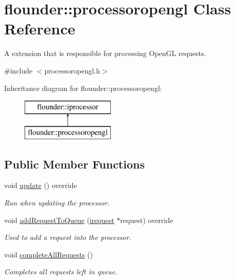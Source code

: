 \hypertarget{classflounder_1_1processoropengl}{}\section{flounder\+:\+:processoropengl Class Reference}
\label{classflounder_1_1processoropengl}


A extension that is responsible for processing Open\+GL requests.  




{\ttfamily \#include $<$processoropengl.\+h$>$}

Inheritance diagram for flounder\+:\+:processoropengl\+:\begin{figure}[H]
\begin{center}
\leavevmode
\includegraphics[height=2.000000cm]{classflounder_1_1processoropengl}
\end{center}
\end{figure}
\subsection*{Public Member Functions}
\begin{DoxyCompactItemize}
\item 
void \hyperlink{classflounder_1_1processoropengl_ad3ca7ada749d785e44fa2b536839f684}{update} () override
\begin{DoxyCompactList}\small\item\em Run when updating the processor. \end{DoxyCompactList}\item 
void \hyperlink{classflounder_1_1processoropengl_a5063ad5c1f350f26733a748a7e039a9a}{add\+Request\+To\+Queue} (\hyperlink{classflounder_1_1irequest}{irequest} $\ast$request) override
\begin{DoxyCompactList}\small\item\em Used to add a request into the processor. \end{DoxyCompactList}\item 
void \hyperlink{classflounder_1_1processoropengl_aa1c943138ae967f19584b7841afdfa2a}{complete\+All\+Requests} ()
\begin{DoxyCompactList}\small\item\em Completes all requests left in queue. \end{DoxyCompactList}\end{DoxyCompactItemize}
